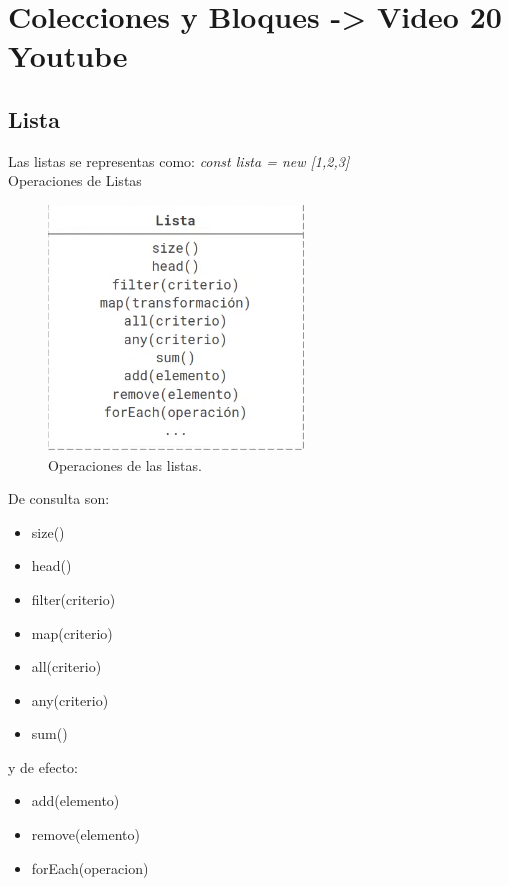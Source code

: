 \documentclass[11pt,a4paper]{article}
\begin{document}
\newpage
\section{Colecciones y Bloques -> Video 20 Youtube}

\subsection{Lista}
Las listas se representas como: \textit{const lista = new [1,2,3]}\\
 
Operaciones de Listas 

\begin{figure}[H]
	\centering
	\includegraphics[scale=0.5]{figuras/operaciones_listas.png}
    \caption{Operaciones de las listas.}
    \label{fig:operaciones de listas}
\end{figure} 

De consulta son:

\begin{itemize}
	\item size()
	\item head()
	\item filter(criterio)
	\item map(criterio)
	\item all(criterio)
	\item any(criterio)
	\item sum()
\end{itemize}

y de efecto:

\begin{itemize}
	\item add(elemento)
	\item remove(elemento)
	\item forEach(operacion)
\end{itemize}
\end{document}
